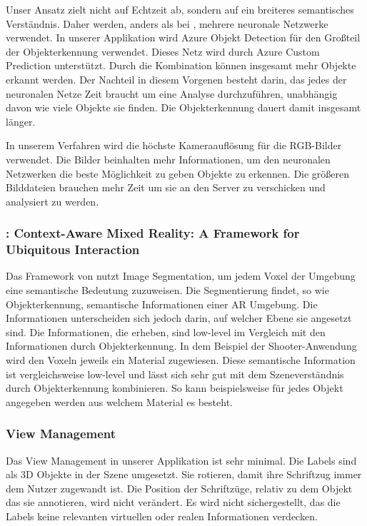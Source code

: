 Unser Ansatz zielt nicht auf Echtzeit ab, sondern auf ein breiteres semantisches Verständnis. Daher werden, anders als bei \cite{LabelingLanguageLearning}, mehrere neuronale Netzwerke verwendet. In unserer Applikation wird Azure Objekt Detection für den Großteil der Objekterkennung verwendet. Dieses Netz wird durch Azure Custom Prediction unterstützt. Durch die Kombination können insgesamt mehr Objekte erkannt werden. Der Nachteil in diesem Vorgenen besteht darin, das jedes der neuronalen Netze Zeit braucht um eine Analyse durchzuführen, unabhängig davon wie viele Objekte sie finden. Die Objekterkennung dauert damit insgesamt länger.

In unserem Verfahren wird die höchste Kameraauflösung für die RGB-Bilder verwendet. Die Bilder beinhalten mehr Informationen, um den neuronalen Netzwerken die beste Möglichkeit zu geben Objekte zu erkennen. Die größeren Bilddateien brauchen mehr Zeit um sie an den Server zu verschicken und analysiert zu werden.\citep{LabelingLanguageLearning}

\subsubsection*{\cite{contextawaremixedreality}: Context-Aware Mixed Reality: A Framework for Ubiquitous Interaction}
Das Framework von \cite{contextawaremixedreality} nutzt Image Segmentation, um jedem Voxel der Umgebung eine semantische Bedeutung zuzuweisen. Die Segmentierung findet, so wie Objekterkennung, semantische Informationen einer AR Umgebung. Die Informationen unterscheiden sich jedoch darin, auf welcher Ebene sie angesetzt sind. Die Informationen, die \cite{contextawaremixedreality} erheben, sind low-level im Vergleich mit den Informationen durch Objekterkennung. In dem Beispiel der Shooter-Anwendung wird den Voxeln jeweils ein Material zugewiesen. Diese semantische Information ist vergleichsweise low-level und lässt sich sehr gut mit dem Szeneverständnis durch Objekterkennung kombinieren. So kann beispielsweise für jedes Objekt angegeben werden aus welchem Material es besteht.\citep{contextawaremixedreality}



\subsubsection*{View Management}
Das View Management in unserer Applikation ist sehr minimal. Die Labels sind als 3D Objekte in der Szene umgesetzt. Sie rotieren, damit ihre Schriftzug immer dem Nutzer zugewandt ist. Die Position der Schriftzüge, relativ zu dem Objekt das sie annotieren, wird nicht verändert. Es wird nicht sichergestellt, das die Labels keine relevanten virtuellen oder realen Informationen verdecken. 


